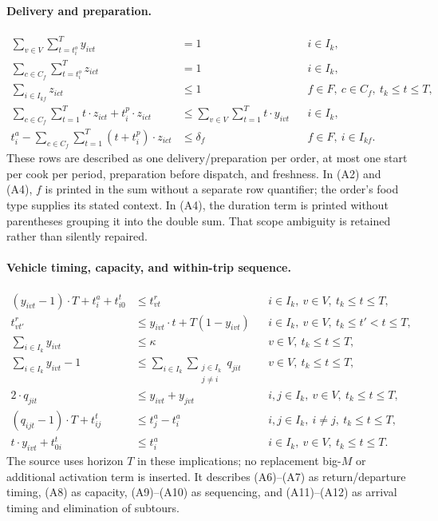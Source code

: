 \documentclass{article}
\begin{document}
\paragraph{Delivery and preparation.}
\begin{align}
\sum_{v\in V}\sum_{t=t_i^o}^{T}y_{ivt}
 &=1 &&i\in I_k, \tag{A1}\\
\sum_{c\in C_f}\sum_{t=t_i^o}^{T}z_{ict}
 &=1 &&i\in I_k, \tag{A2}\\
\sum_{i\in I_{kf}}z_{ict}
 &\leq 1 &&f\in F,\ c\in C_f,\ t_k\leq t\leq T, \tag{A3}\\
\sum_{c\in C_f}\sum_{t=1}^{T}t\cdot z_{ict}
   +t_i^p\cdot z_{ict}
 &\leq \sum_{v\in V}\sum_{t=1}^{T}t\cdot y_{ivt}
 &&i\in I_k, \tag{A4}\\
t_i^a-\sum_{c\in C_f}\sum_{t=1}^{T}(t+t_i^p)\cdot z_{ict}
 &\leq \delta_f &&f\in F,\ i\in I_{kf}. \tag{A5}
\end{align}
These rows are described as one delivery/preparation per order, at most one start per cook per period, preparation before dispatch, and freshness. In (A2) and (A4), \(f\) is printed in the sum without a separate row quantifier; the order's food type supplies its stated context. In (A4), the duration term is printed without parentheses grouping it into the double sum. That scope ambiguity is retained rather than silently repaired.

\paragraph{Vehicle timing, capacity, and within-trip sequence.}
\begin{align}
(y_{ivt}-1)\cdot T+t_i^a+t_{i0}^t
 &\leq t_{vt}^r
 &&i\in I_k,\ v\in V,\ t_k\leq t\leq T, \tag{A6}\\
t_{vt'}^r
 &\leq y_{ivt}\cdot t+T(1-y_{ivt})
 &&i\in I_k,\ v\in V,\ t_k\leq t'<t\leq T, \tag{A7}\\
\sum_{i\in I_k}y_{ivt}
 &\leq\kappa
 &&v\in V,\ t_k\leq t\leq T, \tag{A8}\\
\sum_{i\in I_k}y_{ivt}-1
 &\leq\sum_{i\in I_k}\sum_{\substack{j\in I_k\\j\ne i}}q_{jit}
 &&v\in V,\ t_k\leq t\leq T, \tag{A9}\\
2\cdot q_{jit}
 &\leq y_{ivt}+y_{jvt}
 &&i,j\in I_k,\ v\in V,\ t_k\leq t\leq T, \tag{A10}\\
(q_{ijt}-1)\cdot T+t_{ij}^t
 &\leq t_j^a-t_i^a
 &&i,j\in I_k,\ i\ne j,\ t_k\leq t\leq T, \tag{A11}\\
t\cdot y_{ivt}+t_{0i}^t
 &\leq t_i^a
 &&i\in I_k,\ v\in V,\ t_k\leq t\leq T. \tag{A12}
\end{align}
The source uses horizon \(T\) in these implications; no replacement big-\(M\) or additional activation term is inserted. It describes (A6)--(A7) as return/departure timing, (A8) as capacity, (A9)--(A10) as sequencing, and (A11)--(A12) as arrival timing and elimination of subtours.
\end{document}
